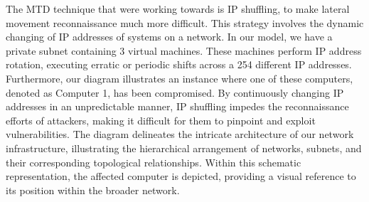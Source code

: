 The MTD technique that were working towards is IP shuffling, to make 
lateral movement reconnaissance much more difficult. This strategy 
involves the dynamic changing of IP addresses of systems on a network. 
In our model, we have a private subnet containing 3 virtual machines. 
These machines perform IP address rotation, executing erratic or periodic
shifts across a 254 different IP addresses. Furthermore, our diagram 
illustrates an instance where one of these computers, denoted as Computer 1,
has been compromised. By continuously changing IP addresses in an 
unpredictable manner, IP shuffling impedes the reconnaissance efforts of 
attackers, making it difficult for them to pinpoint and exploit vulnerabilities.
The diagram delineates the intricate architecture of our network infrastructure, 
illustrating the hierarchical arrangement of networks, subnets, and their 
corresponding topological relationships. Within this schematic representation, 
the affected computer is depicted, providing a visual reference to its 
position within the broader network.  
